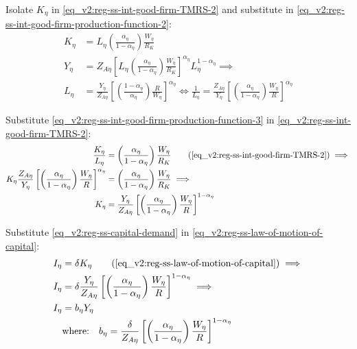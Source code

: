 \documentclass[../thesis.tex]{subfiles}
\begin{document}
Isolate $K_{\eta}$ in \ref{eq_v2:reg-ss-int-good-firm-TMRS-2} and substitute in \ref{eq_v2:reg-ss-int-good-firm-production-function-2}:
\begin{align}
	K_{\eta} &= L_{\eta} \left( \frac{{\alpha_{\eta}}}{1-\alpha_{\eta}} \right) \frac{W_{\eta}}{R_{K}} \nonumber \\
	Y_{\eta} &= Z_{A\eta} \left[ L_{\eta} \left( \frac{{\alpha_{\eta}}}{1-\alpha_{\eta}} \right) \frac{W_{\eta}}{R_{K}} \right]^{\alpha_{\eta}} L_{\eta}^{1-{\alpha_{\eta}}} \implies \nonumber \\
	L_{\eta} &= \frac{Y_{\eta}}{Z_{A\eta}} \left[ \left( \frac{1-\alpha_{\eta}}{{\alpha_{\eta}}} \right) \frac{R}{W_{\eta}} \right]^{\alpha_{\eta}} \iff %
	\frac{1}{L_{\eta}} = \frac{Z_{A\eta}}{Y_{\eta}} \left[ \left( \frac{{\alpha_{\eta}}}{1-\alpha_{\eta}} \right) \frac{W_{\eta}}{R} \right]^{\alpha_{\eta}} \label{eq_v2:reg-ss-int-good-firm-production-function-3}
\end{align}


Substitute \ref{eq_v2:reg-ss-int-good-firm-production-function-3} in \ref{eq_v2:reg-ss-int-good-firm-TMRS-2}:
\begin{align}
	\frac{K_{\eta}}{L_{\eta}} &= \left( \frac{{\alpha_{\eta}}}{1-\alpha_{\eta}} \right) \frac{W_{\eta}}{R_{K}} \tag{\ref{eq_v2:reg-ss-int-good-firm-TMRS-2}} \implies \\
	K_{\eta} \frac{Z_{A\eta}}{Y_{\eta}} \left[ \left( \frac{\alpha_{\eta}}{1-\alpha_{\eta}} \right) \frac{W_{\eta}}{R} \right]^{\alpha_{\eta}} &= \left( \frac{{\alpha_{\eta}}}{1-\alpha_{\eta}} \right) \frac{W_{\eta}}{R_{K}} \implies \nonumber \\
	K_{\eta} &= \frac{Y_{\eta}}{Z_{A\eta}} \left[ \left( \frac{{\alpha_{\eta}}}{1-\alpha_{\eta}} \right) \frac{W_{\eta}}{R} \right]^{1 - \alpha_{\eta}} \label{eq_v2:reg-ss-capital-demand}
\end{align}


Substitute \ref{eq_v2:reg-ss-capital-demand} in \ref{eq_v2:reg-ss-law-of-motion-of-capital}:
\begin{align}
	I_{\eta} &= \delta K_{\eta} \tag{\ref{eq_v2:reg-ss-law-of-motion-of-capital}} \implies \\
	I_{\eta} &= \delta \frac{Y_{\eta}}{Z_{A\eta}} \left[ \left( \frac{{\alpha_{\eta}}}{1-\alpha_{\eta}} \right) \frac{W_{\eta}}{R} \right]^{1 - \alpha_{\eta}} \implies \\
	I_{\eta} &= b_{\eta} Y_{\eta} \label{eq_v2:reg-ss-law-of-motion-of-capital-2} \\
	& \text{where:} \quad b_{\eta} = \frac{\delta}{Z_{A\eta}} \left[ \left( \frac{{\alpha_{\eta}}}{1-\alpha_{\eta}} \right) \frac{W_{\eta}}{R} \right]^{1 - \alpha_{\eta}} \label{eq_v2:reg-ss-b-eta}
\end{align}
\end{document}
